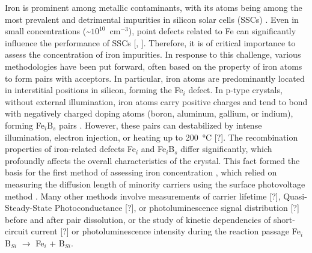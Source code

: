 \documentclass[a4paper,fleqn]{cas-sc}
\begin{document}
Iron is prominent among metallic contaminants, with its atoms being among the most prevalent and detrimental impurities in silicon solar cells (SSCs) \cite{Buonassisi2006}. Even in small concentrations (\textasciitilde{}$\mathrm{10}^{10}$~$\mathrm{cm}^{-3}$), point defects related to Fe can significantly influence the performance of SSCs [\cite{Schubert2015}, \cite{Herguth2022}]. Therefore, it is of critical importance to assess the concentration of iron impurities. In response to this challenge, various methodologies have been put forward, often based on the property of iron atoms to form pairs with acceptors. In particular, iron atoms are predominantly located in interstitial positions in silicon, forming the Fe$_i$ defect. In p-type crystals, without external illumination, iron atoms carry positive charges and tend to bond with negatively charged doping atoms (boron, aluminum, gallium, or indium), forming Fe$_i$B$_s$ pairs \cite{Kimerling1983}. However, these pairs can destabilized by intense illumination, electron injection, or heating up to 200~°C [?]. The recombination properties of iron-related defects Fe$_i$ and Fe$_i$B$_s$ differ significantly, which profoundly affects the overall characteristics of the crystal. This fact formed the basis for the first method of assessing iron concentration \cite{Zoth1990}, which relied on measuring the diffusion length of minority carriers using the surface photovoltage method \cite{Tousek2008}. Many other methods involve measurements of carrier lifetime [?], Quasi-Steady-State Photoconductance [?], or photoluminescence signal distribution [?] before and after pair dissolution, or the study of kinetic dependencies of short-circuit current [?] or photoluminescence intensity during the reaction passage Fe$_i$B$_{Si}$ $\rightarrow$ Fe$_i$ + B$_{Si}$.
\end{document}
